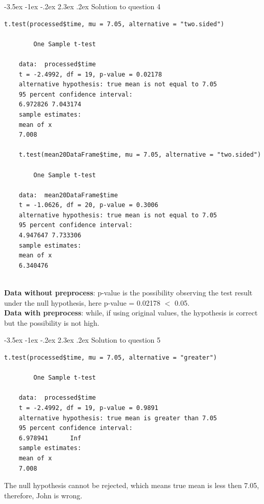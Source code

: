 \documentclass[12pt]{article}
\makeatletter
\renewcommand\section{\@startsection {section}{1}{\z@}%
	{-3.5ex \@plus -1ex \@minus -.2ex}%
	{2.3ex \@plus.2ex}%
	{\normalfont\large\bfseries}}%
\makeatother
\begin{document}
	\section{Solution to question 4}
	\lstset{language=R}
	\lstset{frame=lines}
	\lstset{basicstyle=\footnotesize\ttfamily}
	\begin{lstlisting}[breaklines=true]
	t.test(processed$time, mu = 7.05, alternative = "two.sided")
	
		One Sample t-test
	
	data:  processed$time
	t = -2.4992, df = 19, p-value = 0.02178
	alternative hypothesis: true mean is not equal to 7.05
	95 percent confidence interval:
	6.972826 7.043174
	sample estimates:
	mean of x 
	7.008 
	
	t.test(mean20DataFrame$time, mu = 7.05, alternative = "two.sided")
	
		One Sample t-test
	
	data:  mean20DataFrame$time
	t = -1.0626, df = 20, p-value = 0.3006
	alternative hypothesis: true mean is not equal to 7.05
	95 percent confidence interval:
	4.947647 7.733306
	sample estimates:
	mean of x 
	6.340476 
	
	\end{lstlisting}
	\noindent
	\textbf{Data without preprocess}: p-value is the possibility observing the test result under the null hypothesis, here p-value = 0.02178 $<$ 0.05.\\
	\textbf{Data with preprocess}: while, if using original values, the hypothesis is correct but the possibility is not high.

	\section{Solution to question 5}
	\lstset{language=R}
	\lstset{frame=lines}
	\lstset{basicstyle=\footnotesize\ttfamily}
	\begin{lstlisting}[breaklines=true]
	t.test(processed$time, mu = 7.05, alternative = "greater")
	
		One Sample t-test
	
	data:  processed$time
	t = -2.4992, df = 19, p-value = 0.9891
	alternative hypothesis: true mean is greater than 7.05
	95 percent confidence interval:
	6.978941      Inf
	sample estimates:
	mean of x 
	7.008 
	\end{lstlisting}
	The null hypothesis cannot be rejected, which means true mean is less then 7.05, therefore, John is wrong.	
	
\end{document}
